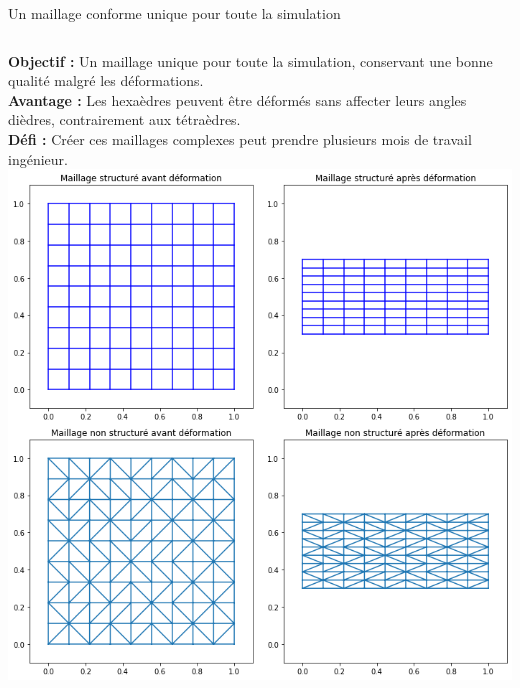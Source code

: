 \documentclass{beamer}
\begin{document}
\begin{frame}{Un maillage conforme unique pour toute la simulation}
    \begin{columns}
    \small{
        \textbf{Objectif :} Un maillage unique pour toute la simulation, conservant une bonne qualité malgré les déformations.\\
    }
    \vspace{0.3cm}
    \small{
        \textbf{Avantage :} Les hexaèdres peuvent être déformés sans affecter leurs angles dièdres, contrairement aux tétraèdres.\\
    }
    \vspace{0.3cm}
    \small{
        \textbf{Défi :} Créer ces maillages complexes peut prendre plusieurs mois de travail ingénieur.\\
    }
        \includegraphics[width=\textwidth]{img/choix_maillage/deformation_low_angle.png}
    \end{columns}
\end{frame}
\end{document}
